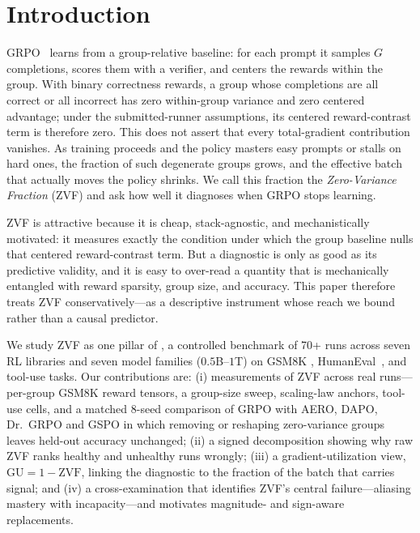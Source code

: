 \section{Introduction}
\label{sec:p2-intro}
GRPO~\citep{guo2025deepseekr1, shao2024deepseekmath} learns from a group-relative
baseline: for each prompt it samples $G$ completions, scores them with a verifier,
and centers the rewards within the group. With binary correctness rewards, a group
whose completions are all correct or all incorrect has zero within-group variance
and zero centered advantage; under the submitted-runner assumptions, its centered
reward-contrast term is therefore zero. This does not assert that every
total-gradient contribution vanishes. As training proceeds
and the policy masters easy prompts or stalls on hard ones, the fraction of such
degenerate groups grows, and the effective batch that actually moves the policy
shrinks. We call this fraction the \emph{Zero-Variance Fraction} (ZVF) and ask how
well it diagnoses when GRPO stops learning.

ZVF is attractive because it is cheap, stack-agnostic, and mechanistically
motivated: it measures exactly the condition under which the group baseline nulls
that centered reward-contrast term. But a diagnostic is only as good as its predictive validity, and it is
easy to over-read a quantity that is mechanically entangled with reward sparsity,
group size, and accuracy. This paper therefore treats ZVF conservatively---as a
descriptive instrument whose reach we bound rather than a causal predictor.

We study ZVF as one pillar of \ours{}, a controlled benchmark of 70+ runs across
seven RL libraries and seven model families ($0.5$B--$1$T) on GSM8K
\citep{cobbe2021training}, HumanEval~\citep{chen2021codex}, and tool-use tasks.
Our contributions are: (i) measurements of ZVF across real runs---per-group
GSM8K reward tensors, a group-size sweep, scaling-law anchors, tool-use cells, and
a matched 8-seed comparison of GRPO with AERO, DAPO, Dr.~GRPO and GSPO in which
removing or reshaping zero-variance groups leaves held-out accuracy unchanged;
(ii) a signed decomposition showing why raw ZVF ranks healthy and unhealthy runs
wrongly; (iii) a gradient-utilization view, $\mathrm{GU} = 1 - \mathrm{ZVF}$,
linking the diagnostic to the fraction of the batch that carries signal; and (iv) a
cross-examination that identifies ZVF's central failure---aliasing mastery with
incapacity---and motivates magnitude- and sign-aware replacements.

